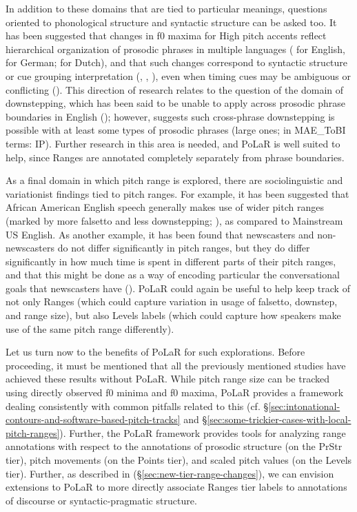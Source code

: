 \documentclass[11pt, twoside]{memoir}
\begin{document}
In addition to these domains that are tied to particular meanings, questions oriented to phonological structure and syntactic structure can be asked too. It has been suggested that changes in f0 maxima for High pitch accents reflect hierarchical organization of prosodic phrases in multiple languages (\citealt{ladd88} for English, \citealt{fery-05} for German; \citealt{berg-92} for Dutch), and that such changes correspond to syntactic structure or cue grouping interpretation (\citealt{ladd88, ladd92}, \citealt{fery-05}, \citealt{kentnerfery13}), even when timing cues may be ambiguous or conflicting (\citealt{brugos15}). This direction of research relates to the question of the domain of downstepping, which has been said to be unable to apply across prosodic phrase boundaries in English (\citealt{beckmanayers97}); however, \citealt{sturman19} suggests such cross-phrase downstepping is possible with at least some types of prosodic phrases (large ones; in MAE\_ToBI terms: IP). Further research in this area is needed, and PoLaR is well suited to help, since Ranges are annotated completely separately from phrase boundaries.

As a final domain in which pitch range is explored, there are sociolinguistic and variationist findings tied to pitch ranges. For example, it has been suggested that African American English speech generally makes use of wider pitch ranges (marked by more falsetto and less downstepping; \citealt{wolfram-02, thomas07}), as compared to Mainstream US English. As another example, it has been found that newscasters and non-newscasters do not differ significantly in pitch ranges, but they do differ significantly in how much time is spent in different parts of their pitch ranges, and that this might be done as a way of encoding particular the conversational goals that newscasters have (\citealt{gasser-19}). PoLaR could again be useful to help keep track of not only Ranges (which could capture variation in usage of falsetto, downstep, and range size), but also Levels labels (which could capture how speakers make use of the same pitch range differently).

Let us turn now to the benefits of PoLaR for such explorations. Before proceeding, it must be mentioned that all the previously mentioned studies have achieved these results without PoLaR. While pitch range size can be tracked using directly observed f0 minima and f0 maxima, PoLaR provides a framework  dealing consistently with common pitfalls related to this (cf. §\ref{sec:intonational-contours-and-software-based-pitch-tracks} and §\ref{sec:some-trickier-cases-with-local-pitch-ranges}). Further, the PoLaR framework provides tools for analyzing range annotations with respect to the annotations of prosodic structure (on the PrStr tier), pitch movements (on the Points tier), and scaled pitch values (on the Levels tier). Further, as described in (§\ref{sec:new-tier-range-changes}), we can envision extensions to PoLaR to more directly associate Ranges tier labels to annotations of discourse or syntactic-pragmatic structure. 
%
\newline
\end{document}
